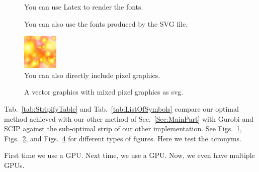 \begin{figure}
    
    \caption[Vector graphics with fonts rendered by latex]{You can use Latex to render the fonts.}\label{fig:latexfonts}
\end{figure}

\begin{figure}
    
    \caption[Vector graphics with fonts directly taken from the file]{You can also use the fonts produced by the SVG file.}\label{fig:svgfonts}
\end{figure}

\begin{figure}
    \centering
    \includegraphics[width=\columnwidth]{imgs/img.png}
    \caption[Pixel graphics]{You can also directly include pixel graphics.}\label{fig:pixel}
\end{figure}

\begin{figure}
    \centering
    
    \caption[SVG From a PoiwerPoint]{A vector graphics with mixed pixel graphics as svg.}\label{fig:pixel}
\end{figure}

Tab.~\ref{tab:StripifyTable} and Tab.~\ref{tab:ListOfSymbols} compare our optimal 
method achieved with our other method
of Sec.~\ref{Sec:MainPart} with Gurobi and SCIP against the sub-optimal strip of our 
other implementation.
See Figs.~\ref{fig:latexfonts}, Figs.~\ref{fig:svgfonts}, and Figs.~\ref{fig:pixel} for different types of figures.
Here we test the acronyms.

First time we use a \ac{GPU}.
Next time, we use a \ac{GPU}.
Now, we even have multiple \acp{GPU}.
